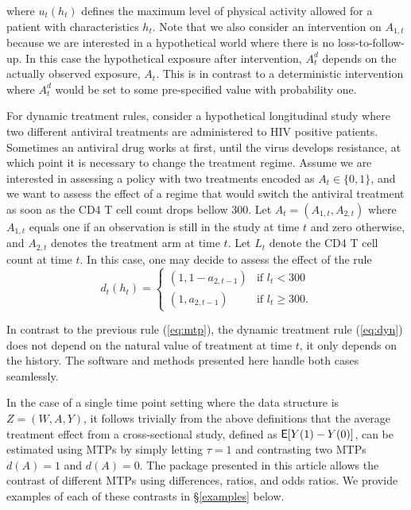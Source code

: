 \documentclass[]{jss}
\begin{document}
where \(u_t(h_t)\) defines the maximum level of
physical activity allowed for a patient with characteristics
$h_t$. Note that we also consider an intervention on $A_{1,t}$ because
we are interested in a hypothetical world where there is no
loss-to-follow-up. In this case the hypothetical exposure after
intervention, \(A^{d}_t\) depends on the actually observed exposure,
\(A_t\). This is in contrast to a deterministic intervention where
\(A^{d}_t\) would be set to some pre-specified value with probability
one.


For dynamic treatment rules, consider a hypothetical longitudinal
study where two different antiviral treatments are administered to HIV
positive patients. Sometimes an antiviral drug works at first, until
the virus develops resistance, at which point it is necessary to
change the treatment regime. Assume we are interested in assessing a
policy with two treatments encoded as $A_t\in \{0,1\}$, and we want to
assess the effect of a regime that would switch the antiviral
treatment as soon as the CD4 T cell count drops bellow 300. Let
\(A_t = (A_{1, t}, A_{2, t})\) where \(A_{1, t}\) equals one if an
observation is still in the study at time \(t\) and zero otherwise,
and \(A_{2, t}\) denotes the treatment arm at time $t$. Let $L_t$
denote the CD4 T cell count at time $t$. In this case, one may decide
to assess the effect of the rule
\begin{equation}\label{eq:dyn}
  d_t(h_t)=
  \begin{cases}
    (1, 1 - a_{2,t-1}) & \text{if } l_t < 300  \\
    (1, a_{2,t-1}) & \text{if } l_t  \geq 300.
  \end{cases}
\end{equation}

In contrast to the previous rule (\ref{eq:mtp}), the dynamic treatment
rule (\ref{eq:dyn}) does not depend on the natural value of treatment
at time $t$, it only depends on the history. %
The software and methods presented here handle both cases seamlessly.

In the case of a single time point setting where the data structure is
$Z=(W,A,Y)$, it follows trivially from the above definitions that the
average treatment effect from a cross-sectional study, defined as
$\mathsf{E}[Y(1) - Y(0)]$, can be estimated using MTPs by simply letting
$\tau = 1$ and contrasting two MTPs $d(A)=1$ and $d(A)=0$. The
 package presented in this article allows the contrast of
different MTPs using differences, ratios, and odds ratios. We provide
examples of each of these contrasts in \S \ref{examples} below.
\end{document}
